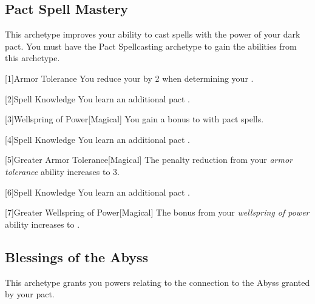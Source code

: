 

    \subsection{Pact Spell Mastery}
        This archetype improves your ability to cast spells with the power of your dark pact.
        You must have the Pact Spellcasting archetype to gain the abilities from this archetype.

        [1]{Armor Tolerance} You reduce your  by 2 when determining your .


        [2]{Spell Knowledge} You learn an additional pact .

        [3]{Wellspring of Power}[Magical]
        You gain a  bonus to  with pact spells.

        [4]{Spell Knowledge} You learn an additional pact .

        [5]{Greater Armor Tolerance}[Magical] The penalty reduction from your \textit{armor tolerance} ability increases to 3.

        [6]{Spell Knowledge} You learn an additional pact .

        [7]{Greater Wellspring of Power}[Magical]
        The bonus from your \textit{wellspring of power} ability increases to .

    \subsection{Blessings of the Abyss}
        This archetype grants you powers relating to the connection to the Abyss granted by your pact.

